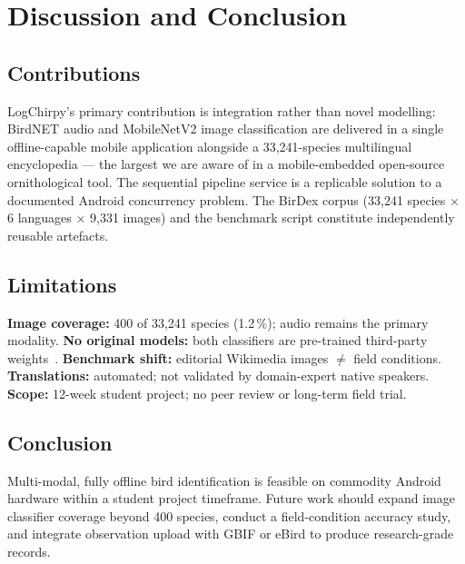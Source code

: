 \section{Discussion and Conclusion}
\label{sec:conc}

\subsection{Contributions}

LogChirpy's primary contribution is integration rather than novel modelling:
BirdNET audio and MobileNetV2 image classification are delivered in a single
offline-capable mobile application alongside a 33,241-species multilingual
encyclopedia — the largest we are aware of in a mobile-embedded open-source
ornithological tool.
The sequential pipeline service is a replicable solution to a documented
Android concurrency problem.
The BirDex corpus (33,241 species × 6 languages × 9,331 images) and the
benchmark script constitute independently reusable artefacts.

\subsection{Limitations}

\textbf{Image coverage:} 400 of 33,241 species (1.2\,\%); audio remains the
primary modality.
\textbf{No original models:} both classifiers are pre-trained third-party
weights~\cite{BirdNET2021,Sandler2018,BirdClassifier2023}.
\textbf{Benchmark shift:} editorial Wikimedia images $\neq$ field conditions.
\textbf{Translations:} automated; not validated by domain-expert native speakers.
\textbf{Scope:} 12-week student project; no peer review or long-term field trial.

\subsection{Conclusion}

Multi-modal, fully offline bird identification is feasible on commodity Android
hardware within a student project timeframe.
Future work should expand image classifier coverage beyond 400 species, conduct
a field-condition accuracy study, and integrate observation upload with GBIF or
eBird to produce research-grade records.
